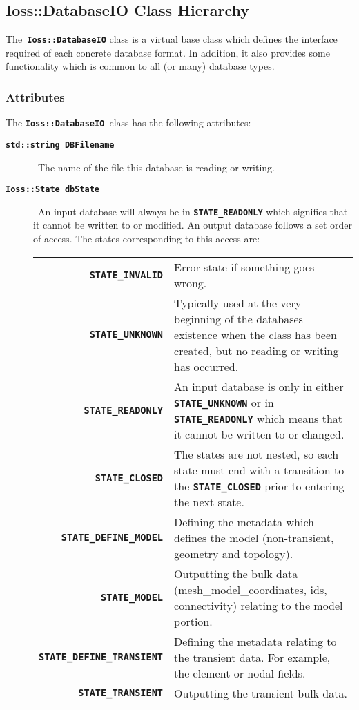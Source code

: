 \documentclass[11pt,twoside]{article}
\newcommand{\code}[1]
   {\mbox{\bf\tt #1}\null}
\begin{document}
\subsection{Ioss::DatabaseIO Class Hierarchy}
The\code{ Ioss::DatabaseIO} class is a virtual base class
which defines the interface required of each concrete database format.
In addition, it also provides some functionality which is common to all
(or many) database types.

\subsubsection{Attributes}
The \code{Ioss::DatabaseIO }class has the following
attributes:

\begin{description}
\item [\code{std::string DBFilename}] --The name of the file
this database is reading or writing.
\item [\code{Ioss::State dbState}] --An input database will
always be in \code{STATE\_READONLY} which signifies that it
cannot be written to or modified. An output database follows a set
order of access. The states corresponding to this access are:
\begin{center}
\begin{tabular}{rp{4in}}
\code{STATE\_INVALID}&Error state if something goes wrong.\\
\code{STATE\_UNKNOWN}&Typically used at the very
	beginning of the databases existence when the class has been created,
	but no reading or writing has occurred.\\
\code{STATE\_READONLY}&An input database is only in
	either \code{STATE\_UNKNOWN} or in
	\code{STATE\_READONLY} which means that it cannot be written
	to or changed.\\
\code{STATE\_CLOSED}&The states are not nested, so each
	state must end with a transition to the \code{STATE\_CLOSED}
 	prior to entering the next state.\\
\code{STATE\_DEFINE\_MODEL}&Defining the metadata which
	defines the model (non{}-transient, geometry and topology).\\
\code{STATE\_MODEL}&Outputting the bulk data
	(mesh\_model\_coordinates, ids, connectivity) relating to the model portion.\\
\code{STATE\_DEFINE\_TRANSIENT}&Defining the metadata
	relating to the transient data. For example, the element or nodal
	fields.\\
\code{STATE\_TRANSIENT}&Outputting the transient bulk data.\\

\end{tabular}
\end{center}
\end{description}
\end{document}
